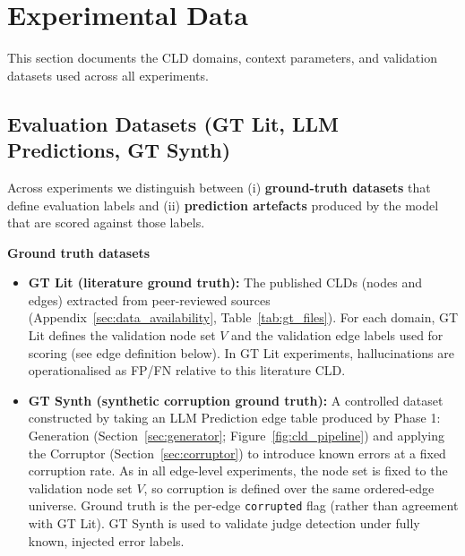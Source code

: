 \chapter{Experimental Data}
\label{sec:experimental_data}

This section documents the CLD domains, context parameters, and validation datasets used across all experiments.

\section{Evaluation Datasets (GT Lit, LLM Predictions, GT Synth)}
\label{sec:evaluation_datasets}

Across experiments we distinguish between (i) \textbf{ground-truth datasets} that define evaluation labels and (ii) \textbf{prediction artefacts} produced by the model that are scored against those labels.

\noindent\textbf{Ground truth datasets}
\begin{itemize}[noitemsep]
    \item \textbf{GT Lit (literature ground truth):} The published CLDs (nodes and edges) extracted from peer-reviewed sources (Appendix~\ref{sec:data_availability}, Table~\ref{tab:gt_files}). For each domain, GT Lit defines the validation node set \(V\) and the validation edge labels used for scoring (see edge definition below). In GT Lit experiments, hallucinations are operationalised as FP/FN relative to this literature CLD.
    \item \textbf{GT Synth (synthetic corruption ground truth):} A controlled dataset constructed by taking an LLM Prediction edge table produced by Phase 1: Generation (Section~\ref{sec:generator}; Figure~\ref{fig:cld_pipeline}) and applying the Corruptor (Section~\ref{sec:corruptor}) to introduce known errors at a fixed corruption rate. As in all edge-level experiments, the node set is fixed to the validation node set \(V\), so corruption is defined over the same ordered-edge universe. Ground truth is the per-edge \texttt{corrupted} flag (rather than agreement with GT Lit). GT Synth is used to validate judge detection under fully known, injected error labels.
\end{itemize}

